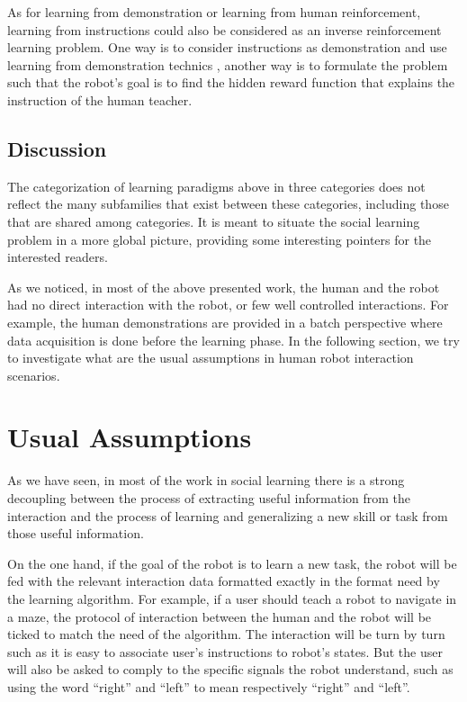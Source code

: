 As for learning from demonstration or learning from human reinforcement, learning from instructions could also be considered as an inverse reinforcement learning problem. One way is to consider instructions as demonstration and use learning from demonstration technics , another way is to formulate the problem such that the robot's goal is to find the hidden reward function that explains the instruction of the human teacher.

\subsection{Discussion}

The categorization of learning paradigms above in three categories does not reflect the many subfamilies that exist between these categories, including those that are shared among categories. It is meant to situate the social learning problem in a more global picture, providing some interesting pointers for the interested readers. 

As we noticed, in most of the above presented work, the human and the robot had no direct interaction with the robot, or few well controlled interactions. For example, the human demonstrations are provided in a batch perspective where data acquisition is done
before the learning phase. In the following section, we try to investigate what are the usual assumptions in human robot interaction scenarios.

\section{Usual Assumptions}

As we have seen, in most of the work in social learning there is a strong decoupling between the process of extracting useful information from the interaction and the process of learning and generalizing a new skill or task from those useful information.

On the one hand, if the goal of the robot is to learn a new task, the robot will be fed with the relevant interaction data formatted exactly in the format need by the learning algorithm. For example, if a user should teach a robot to navigate in a maze, the protocol of interaction between the human and the robot will be ticked to match the need of the algorithm. The interaction will be turn by turn such as it is easy to associate user's instructions to robot's states. But the user will also be asked to comply to the specific signals the robot understand, such as using the word ``right'' and ``left'' to mean respectively ``right'' and ``left''.

